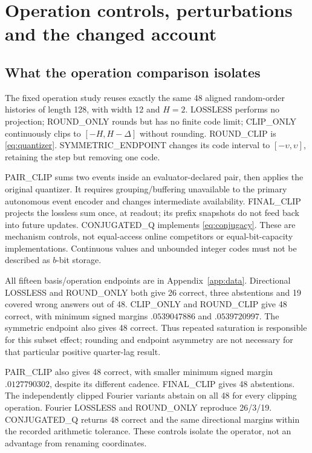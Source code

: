 \section{Operation controls, perturbations and the changed account}\label{sec:controls}
\subsection{What the operation comparison isolates}
The fixed operation study reuses exactly the same 48 aligned random-order histories of length 128, with width 12 and $H=2$. LOSSLESS performs no projection; ROUND\_ONLY rounds but has no finite code limit; CLIP\_ONLY continuously clips to $[-H,H-\Delta]$ without rounding. ROUND\_CLIP is \eqref{eq:quantizer}. SYMMETRIC\_ENDPOINT changes its code interval to $[-\upsilon,\upsilon]$, retaining the step but removing one code.

PAIR\_CLIP sums two events inside an evaluator-declared pair, then applies the original quantizer. It requires grouping/buffering unavailable to the primary autonomous event encoder and changes intermediate availability. FINAL\_CLIP projects the lossless sum once, at readout; its prefix snapshots do not feed back into future updates. CONJUGATED\_Q implements \eqref{eq:conjugacy}. These are mechanism controls, not equal-access online competitors or equal-bit-capacity implementations. Continuous values and unbounded integer codes must not be described as $b$-bit storage.

All fifteen basis/operation endpoints are in Appendix~\ref{app:data}. Directional LOSSLESS and ROUND\_ONLY both give 26 correct, three abstentions and 19 covered wrong answers out of 48. CLIP\_ONLY and ROUND\_CLIP give 48 correct, with minimum signed margins $.0539047886$ and $.0539720997$. The symmetric endpoint also gives 48 correct. Thus repeated saturation is responsible for this subset effect; rounding and endpoint asymmetry are not necessary for that particular positive quarter-lag result.

PAIR\_CLIP also gives 48 correct, with smaller minimum signed margin $.0127790302$, despite its different cadence. FINAL\_CLIP gives 48 abstentions. The independently clipped Fourier variants abstain on all 48 for every clipping operation. Fourier LOSSLESS and ROUND\_ONLY reproduce 26/3/19. CONJUGATED\_Q returns 48 correct and the same directional margins within the recorded arithmetic tolerance. These controls isolate the operator, not an advantage from renaming coordinates.

